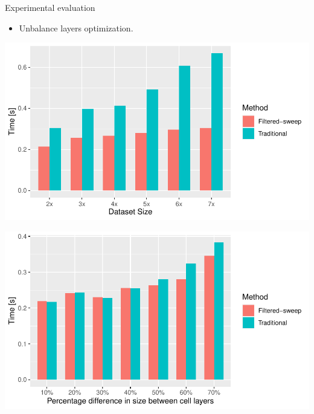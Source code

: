 \documentclass{beamer}
\begin{document}
    \begin{frame}{Experimental evaluation}
        \begin{itemize}
            \item Unbalance layers optimization.
        \end{itemize}
        \vspace{1cm}
        \begin{minipage}{0.49\textwidth}
            \centering
            \includegraphics[width=\textwidth]{figures/unbalance1}
        \end{minipage}\hfill %
        \begin{minipage}{0.49\textwidth}
            \centering
            \includegraphics[width=\textwidth]{figures/unbalance2}
        \end{minipage}
    \end{frame}    
\end{document}
